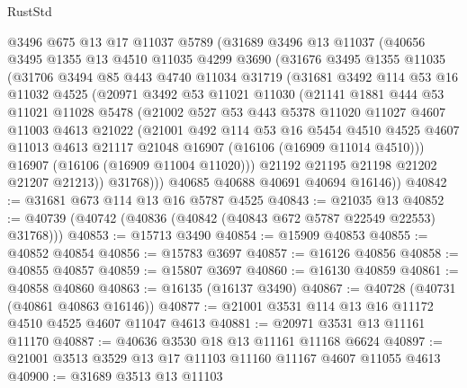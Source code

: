 \begin{lexlean}{RustStd}
\begin{coremodule}
    @3496
    @675
    @13
    @17
    @11037
    @5789
    (@31689
      @3496
      @13
      @11037
      (@40656
        @3495
        @1355
        @13
        @4510
        @11035
        @4299
        @3690
        (@31676
          @3495
          @1355
          @11035
          (@31706
            @3494
            @85
            @443
            @4740
            @11034
            @31719
            (@31681
              @3492
              @114
              @53
              @16
              @11032
              @4525
              (@20971
                @3492
                @53
                @11021
                @11030
                (@21141
                  @1881
                  @444
                  @53
                  @11021
                  @11028
                  @5478
                  (@21002
                    @527
                    @53
                    @443
                    @5378
                    @11020
                    @11027
                    @4607
                    @11003
                    @4613
                    @21022
                    (@21001
                      @492
                      @114
                      @53
                      @16
                      @5454
                      @4510
                      @4525
                      @4607
                      @11013
                      @4613
                      @21117
                      @21048
                      @16907
                      (@16106 (@16909 @11014 @4510)))
                    @16907
                    (@16106 (@16909 @11004 @11020)))
                  @21192
                  @21195
                  @21198
                  @21202
                  @21207
                  @21213))
              @31768)))
        @40685
        @40688
        @40691
        @40694
        @16146))
@40842 := @31681 @673 @114 @13 @16 @5787 @4525
@40843 := @21035 @13
@40852 := @40739 (@40742 (@40836 (@40842 (@40843 @672 @5787 @22549 @22553) @31768)))
@40853 := @15713 @3490
@40854 := @15909 @40853
@40855 := @40852 @40854
@40856 := @15783 @3697
@40857 := @16126 @40856
@40858 := @40855 @40857
@40859 := @15807 @3697
@40860 := @16130 @40859
@40861 := @40858 @40860
@40863 := @16135 (@16137 @3490)
@40867 := @40728 (@40731 (@40861 @40863 @16146))
@40877 := @21001 @3531 @114 @13 @16 @11172 @4510 @4525 @4607 @11047 @4613
@40881 := @20971 @3531 @13 @11161 @11170
@40887 := @40636 @3530 @18 @13 @11161 @11168 @6624
@40897 := @21001 @3513 @3529 @13 @17 @11103 @11160 @11167 @4607 @11055 @4613
@40900 := @31689 @3513 @13 @11103

\end{coremodule}
\end{lexlean}
